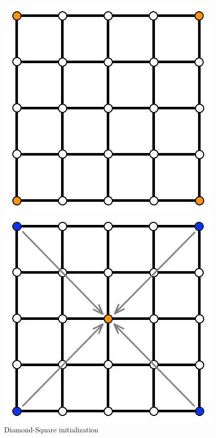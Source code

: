 \documentclass[11pt,a4paper,twoside,openright]{report}
\begin{document}
\begin{figure}[!htb]
  \includegraphics[width=\linewidth]{ds1.png}
  \caption{Diamond-Square initialization}\label{fig:ds1}
\endminipage
{}
  \includegraphics[width=\linewidth]{ds2.png}

\end{figure}
\end{document}
